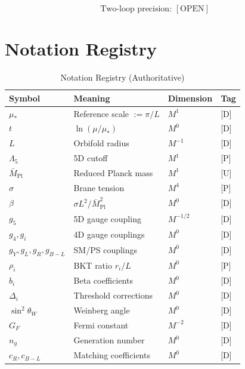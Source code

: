 \documentclass[11pt,a4paper]{article}
\theoremstyle{definition}
\begin{document}
\begin{equation}
\label{eq:two_loop_tag}
\text{Two-loop precision: } [\text{OPEN}]
\end{equation}

\section{Notation Registry}
\label{app:notation}

\begin{table}[h]
\centering
\caption{Notation Registry (Authoritative)}
\label{tab:notation}
\begin{tabular}{@{}llll@{}}
\toprule
\textbf{Symbol} & \textbf{Meaning} & \textbf{Dimension} & \textbf{Tag} \\
\midrule
$\mu_*$ & Reference scale $:= \pi/L$ & $M^1$ & [D] \\
$t$ & $\ln(\mu/\mu_*)$ & $M^0$ & [D] \\
$L$ & Orbifold radius & $M^{-1}$ & [D] \\
$\Lambda_5$ & 5D cutoff & $M^1$ & [P] \\
$\bar{M}_{\text{Pl}}$ & Reduced Planck mass & $M^1$ & [U] \\
$\sigma$ & Brane tension & $M^4$ & [P] \\
$\beta$ & $\sigma L^2/\bar{M}_{\text{Pl}}^2$ & $M^0$ & [D] \\
$g_5$ & 5D gauge coupling & $M^{-1/2}$ & [D] \\
$g_4, g_i$ & 4D gauge couplings & $M^0$ & [D] \\
$g_Y, g_L, g_R, g_{B-L}$ & SM/PS couplings & $M^0$ & [D] \\
$\rho_i$ & BKT ratio $r_i/L$ & $M^0$ & [P] \\
$b_i$ & Beta coefficients & $M^0$ & [D] \\
$\Delta_i$ & Threshold corrections & $M^0$ & [D] \\
$\sin^2\theta_W$ & Weinberg angle & $M^0$ & [D] \\
$G_F$ & Fermi constant & $M^{-2}$ & [D] \\
$n_g$ & Generation number & $M^0$ & [D] \\
$c_R, c_{B-L}$ & Matching coefficients & $M^0$ & [D] \\
\bottomrule
\end{tabular}
\end{table}
\end{document}
